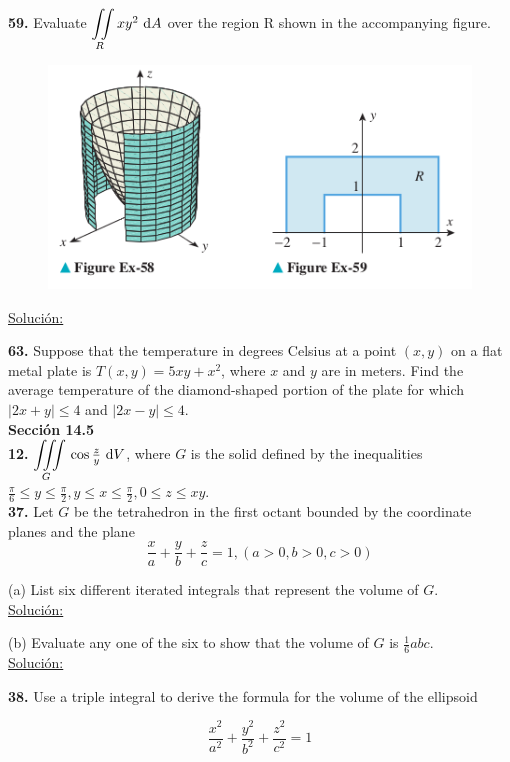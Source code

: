 \documentclass[11pt]{report}
\newcommand{\s}{\underline{Soluci\'{o}n:}}
\begin{document}
\textbf{59.} Evaluate $ {\displaystyle \iint \limits_R } \, xy^2 \, \, \text dA $ over
the region R shown in the accompanying figure. \\
\begin{figure}[h]
\includegraphics[scale=0.5]{img2.png}
\centering
\end{figure}
\s

\textbf{63.} Suppose that the temperature in degrees Celsius at a point $(x, y)$
on a flat metal plate is $T(x, y) = 5xy + x^2 $, where $x$ and $y$ are in meters.
Find the average temperature of the diamond-shaped portion of the plate for which
$|2x + y| \leq 4$ and $|2x - y| \leq 4$. \\

\textbf{Sección 14.5} \\

\textbf{12.} $ {\displaystyle \iiint \limits_G } \, \cos{\frac{z}{y}} \, \, \text dV $,
where $G$ is the solid defined by the inequalities
$\frac{\pi}{6} \leq y \leq \frac{\pi}{2}, y \leq x \leq \frac{\pi}{2}, 0 \leq z \leq xy$. \\


\textbf{37.} Let $G$ be the tetrahedron in the first octant bounded by the
coordinate planes and the plane \\

\[ \frac{x}{a} + \frac{y}{b} + \frac{z}{c} = 1, (a > 0, b > 0, c > 0) \]

(a) List six different iterated integrals that represent the volume of $G$. \\
\s

(b) Evaluate any one of the six to show that the volume of $G$ is $\frac{1}{6} abc$. \\
\s

\textbf{38.} Use a triple integral to derive the formula for the volume of the ellipsoid

\[ \frac{x^2}{a^2} + \frac{y^2}{b^2} + \frac{z^2}{c^2} = 1 \]
\end{document}
